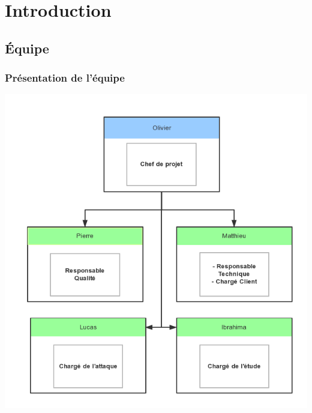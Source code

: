 \section{Introduction}
\subsection{Équipe}
\begin{frame}
    \frametitle{\color{white}Présentation de l'équipe}
  \begin{center}
    \includegraphics[scale=0.30]{guipgteam.png}
  \end{center}
\end{frame}
